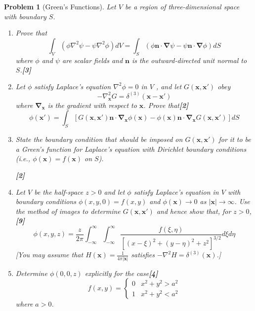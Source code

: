 \documentclass[a4paper]{article}
\theoremstyle{new}
\newtheorem{qns}{Problem}[section]
\begin{document}
\begin{qns}[Green's Functions]
Let $V$ be a region of three-dimensional space with boundary $S$.
\begin{enumerate}[label=(\alph*)]
\item Prove that
$$\int_V(\phi\nabla^2\psi-\psi\nabla^2\phi)dV=\int_S(\phi\mathbf{n}\cdot\boldsymbol{\nabla}\psi-\psi\mathbf{n}\cdot\boldsymbol{\nabla}\phi)dS$$
where $\phi$ and $\psi$ are scalar fields and $\mathbf{n}$ is the outward-directed unit normal to $S$.\hfill\textbf{[3]}
\item Let $\phi$ satisfy Laplace’s equation $\nabla^2\phi=0$ in $V$ , and let $G(\mathbf{x},\mathbf{x'})$ obey
$$-\nabla^2_{\mathbf{x}}G=\delta^{(3)}(\mathbf{x}-\mathbf{x'})$$
where $\boldsymbol{\nabla}_{\mathbf{x}}$ is the gradient with respect to $\mathbf{x}$. Prove that\hfill\textbf{[2]}
$$\phi(\mathbf{x'})=\int_S[G(\mathbf{x},\mathbf{x'})\mathbf{n}\cdot\boldsymbol{\nabla}_{\mathbf{x}}\phi(\mathbf{x})-\phi(\mathbf{x})\mathbf{n}\cdot\boldsymbol{\nabla}_{\mathbf{x}}G(\mathbf{x},\mathbf{x'})]dS$$
\item State the boundary condition that should be imposed on $G(\mathbf{x}, \mathbf{x'})$ for it to be a Green’s function for Laplace’s equation with Dirichlet boundary conditions (i.e., $\phi(\mathbf{x}) = f(\mathbf{x})$ on $S$).

\hfill\textbf{[2]}
\item Let $V$ be the half-space $z > 0$ and let $\phi$ satisfy Laplace’s equation in $V$ with boundary conditions $\phi(x, y, 0) = f(x, y)$ and $\phi(\mathbf{x})\rightarrow0$ as $|\mathbf{x}|\rightarrow\infty$. Use the method of images to determine $G(\mathbf{x}, \mathbf{x'})$ and hence show that, for $z > 0$,\hfill\textbf{[9]}
$$\phi(x,y,z)=\frac{z}{2\pi}\int_{-\infty}^\infty\int_{-\infty}^\infty\frac{f(\xi,\eta)}{[(x-\xi)^2+(y-\eta)^2+z^2]^{3/2}}d\xi d\eta$$
[You may assume that $H(\mathbf{x}) = \frac{1}{4\pi|\mathbf{x}|}$ satisfies $-\nabla^2H=\delta^{(3)}(\mathbf{x})$.]
\item Determine $\phi(0, 0, z)$ explicitly for the case\hfill\textbf{[4]}
$$f(x,y)=
\left\{
        \begin{array}{ll}
      0 & x^2+y^2>a^2 \\
      1 & x^2+y^2<a^2
        \end{array}
    \right.$$
where $a > 0$.
\end{enumerate}
\end{qns}
\newpage
\end{document}
